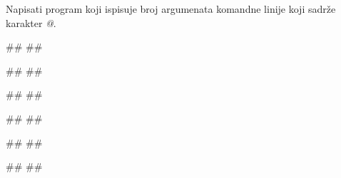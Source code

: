 \begin{Exercise}[label=p2.6_03] 
Napisati program koji ispisuje broj argumenata komandne linije koji sadrže karakter \textit{@}.

\begin{minitest}
\begin{upotreba}{1}
#\naslovPokretanje#
##

#\naslovIzlaz#
##
\end{upotreba}
\end{minitest}
\begin{minitest}
\begin{upotreba}{2}
#\naslovPokretanje#
##

#\naslovIzlaz#
##
\end{upotreba}
\end{minitest}
\begin{minitest}
\begin{upotreba}{3}
#\naslovPokretanje#
##

#\naslovIzlaz#
##
\end{upotreba}
\end{minitest}


\end{Exercise}
\ifresenja
\begin{Answer}[ref=p2.6_03]
\end{Answer}
 \fi


